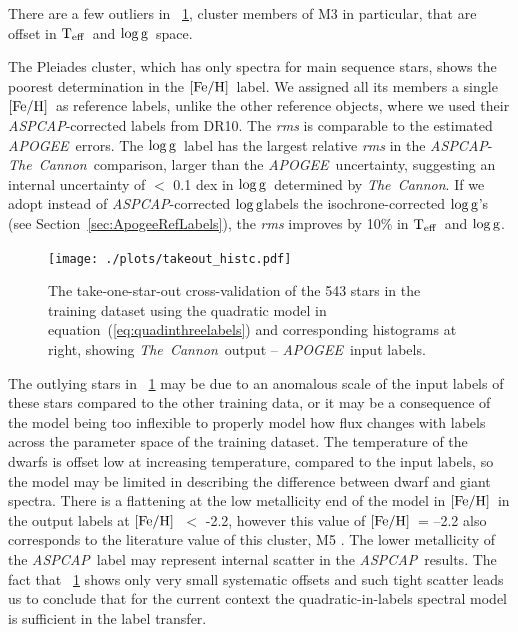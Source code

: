 \documentclass[12pt, preprint]{aastex}
\newcommand{\sectionname}{Section}
\newcommand{\tc}{\textsl{The~Cannon}}
\newcommand{\apogee}{\textsl{APOGEE}}
\newcommand{\aspcap}{\textsl{ASPCAP}}
\newcommand{\teff}{\mbox{$\rm T_{eff}$}}
\newcommand{\feh}{\mbox{$\rm [Fe/H]$}}
\newcommand{\logg}{\mbox{$\rm \log g$}}
\begin{document}
There are a few outliers in \figurename~\ref{fig:takeonestarout}, cluster members of M3 in particular, that are offset in \teff\ and \logg\ space. 

The Pleiades cluster, which has only spectra for main sequence stars, shows the poorest determination in the \feh\ label. We assigned all its members a single \feh ~as reference labels, unlike the other reference objects, where we used their \aspcap -corrected labels from DR10.
The \textit{rms} is comparable to the estimated \apogee\ errors. The \logg\ label has the largest relative \textit{rms} in the \aspcap\--\tc\ comparison, larger than the \apogee\ uncertainty, suggesting an internal uncertainty of $<$ 0.1 dex in \logg\ determined by \tc.
If we adopt instead of \aspcap -corrected \logg labels the isochrone-corrected \logg 's (see \sectionname~\ref{sec:ApogeeRefLabels}), the \textit{rms} improves by 10\% in \teff\ and \logg.

\begin{figure}[h!]
\centering
    \texttt{[image: ./plots/takeout\_histc.pdf]}
\caption{The take-one-star-out cross-validation of the 543 stars in the training dataset using the quadratic model in equation~(\ref{eq:quadinthreelabels}) and corresponding histograms at right, showing \tc\ output -- \apogee\ input labels.}
\label{fig:takeonestarout}
\end{figure}


The outlying stars in \figurename~\ref{fig:takeonestarout} may be due to an anomalous scale of the input labels of these stars compared to the other training data, or it may be a consequence of the model being too inflexible to properly model how flux changes with labels across the parameter space of the training dataset. 
The temperature of the dwarfs is offset low at increasing temperature, compared to the input labels, so the model may be limited in describing the difference between dwarf and giant spectra. 
There is a flattening at the low metallicity end of the model in \feh\ in the output labels at \feh\ $<$ -2.2, however this value of \feh\ = --2.2 also corresponds to the literature value of this cluster, M5 \citep{Meszaros2013}. 
The lower metallicity of the \aspcap\ label may represent internal scatter in the \aspcap\ results.
The fact that \figurename~\ref{fig:takeonestarout} shows only very small systematic offsets and such tight scatter leads us to conclude that for the
current context the quadratic-in-labels spectral model is sufficient in the label transfer. 
\end{document}

